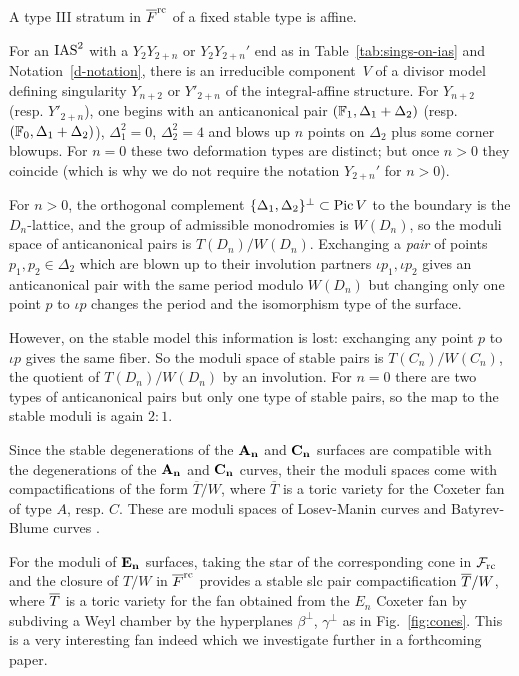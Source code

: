 \documentclass[table,x11names]{amsart}
\begin{document}
 \begin{corollary}\label{cor:affine}
   A type III stratum in ${\overline F}^{{\rm rc}}$ of a fixed stable type 
   is affine.
 \end{corollary}

 \begin{remark}\label{DC-remark}
   For an $\operatorname{IAS}^2$ with a $Y_2Y_{2+n}$ or $Y_2Y_{2+n}'$
   end as in Table~\ref{tab:sings-on-ias} and Notation~\ref{d-notation}, 
  there is an irreducible component~$V$ of a divisor model defining
   singularity $Y_{n+2}$ or $Y'_{2+n}$ of the integral-affine
   structure. For $Y_{n+2}$ (resp. $Y'_{2+n}$), one begins with an anticanonical pair
   $({\mathbb F}_1,\Delta_1+\Delta_2)$ (resp. $({\mathbb F}_0,\Delta_1+\Delta_2)$), 
   $\Delta_1^2=0$, $\Delta_2^2=4$ and blows up $n$ points on $\Delta_2$
   plus some corner blowups.  For $n=0$ these two deformation types 
   are distinct; but once $n>0$ they coincide (which is why we do not require
   the notation $Y_{2+n}'$ for $n>0$).

   For $n>0$,
   the orthogonal complement $\{\Delta_1, \Delta_2\}^\perp \subset \operatorname{Pic} V$ to the
   boundary is the $D_n$-lattice, and the group of admissible
   monodromies is $W(D_n)$, so the moduli space of
   anticanonical pairs is
   $T(D_n)/W(D_n)$. Exchanging a \emph{pair} of points $p_1,p_2\in
   \Delta_2$ which are blown up to their involution partners $\iota
   p_1,\iota p_2$ gives an anticanonical pair with the same period
   modulo $W(D_n)$
   but changing only one point $p$ to $\iota p$ changes the
   period and the isomorphism type of the surface.

   However, on the stable model this information is lost: exchanging
   any point $p$ to $\iota p$ gives the same fiber. So the moduli
   space of stable pairs is $T(C_n)/W(C_n)$, the quotient of
   $T(D_n)/W(D_n)$ by an involution. For $n=0$ there are two types of
   anticanonical pairs but only one type of stable pairs, so the map
   to the stable moduli is again $2:1$. 
 \end{remark}

 \begin{remark}
   Since the stable degenerations of the ${\bf A_n}$ and ${\bf C_n}$
   surfaces are compatible with the degenerations of the ${\bf A_n}$
   and ${\bf C_n}$ curves, their the moduli spaces come with
   compactifications of the form $\overline{T}/W$, where
   $\overline{T}$ is a toric variety for the Coxeter fan of type $A$,
   resp. $C$.  These are moduli spaces of Losev-Manin curves
   \cite{losev2000new-moduli-spaces} and Batyrev-Blume curves
   \cite{batyrev2011on-generalizations}.

   For the moduli of ${\bf E_n}$ surfaces, taking the star of the
   corresponding cone in ${\mathcal F}_{\rm rc}$ and the closure of $T/W$ in
   ${\overline F}^{\rm rc}$ provides a stable slc pair compactification ${\overline T}/W$,
   where ${\overline T}$ is a toric variety for the fan obtained from the $E_n$
   Coxeter fan by subdiving a Weyl chamber by the hyperplanes
   $\beta^\perp$, $\gamma^\perp$ as in Fig.~\ref{fig:cones}. This is a
   very interesting fan indeed which we investigate further 
   in a forthcoming paper.
 \end{remark}
\end{document}
